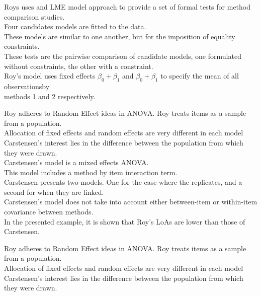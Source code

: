 \documentclass[12pt, a4paper]{report}
\theoremstyle{plain}
\theoremstyle{definition}
\theoremstyle{remark}
\begin{document}
	
	Roys uses and LME model approach to provide a set of formal tests for method comparison studies.\\
	
	Four candidates models are fitted to the data.\\
	
	These models are similar to one another, but for the imposition of equality constraints.\\
	
	These tests are the pairwise comparison of candidate models, one formulated without constraints, the other with a constraint.\\
	
	
	Roy's model uses fixed effects $\beta_0 + \beta_1$ and $\beta_0 + \beta_1$ to specify the mean of all observationsby \\ methods 1 and 2 respectively.
	
	
	Roy adheres to Random Effect ideas in ANOVA. Roy treats items as a sample from a population.\\
	
	Allocation of fixed effects and random effects are very different in each model\\
	
	Carstensen's interest lies in the difference between the population from which they were drawn.\\
	
	Carstensen's model is a mixed effects ANOVA.\\
	
	This model includes a method by item interaction term.\\
	
	Carstensen presents two models. One for the case where the replicates, and a second for when they are linked.\\
	Carstensen's model does not take into account either between-item or within-item covariance between methods.\\
	In the presented example, it is shown that Roy's LoAs are lower than those of Carstensen.
	
	
	Roy adheres to Random Effect ideas in ANOVA. Roy treats items as a sample from a population.\\
	
	Allocation of fixed effects and random effects are very different in each model\\
	
	Carstensen's interest lies in the difference between the population from which they were drawn.\\
	
\end{document}
